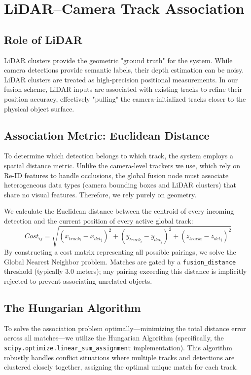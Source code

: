 \documentclass[12pt,a4paper]{report}
\begin{document}
{\section{LiDAR--Camera Track Association}

\subsection{Role of LiDAR}
LiDAR clusters provide the geometric "ground truth" for the system. While camera detections provide semantic labels, their depth estimation can be noisy. LiDAR clusters are treated as high-precision positional measurements. In our fusion scheme, LiDAR inputs are associated with existing tracks to refine their position accuracy, effectively "pulling" the camera-initialized tracks closer to the physical object surface.

\subsection{Association Metric: Euclidean Distance}
To determine which detection belongs to which track, the system employs a spatial distance metric. Unlike the camera-level trackers we use, which rely on Re-ID features to handle occlusions, the global fusion node must associate heterogeneous data types (camera bounding boxes and LiDAR clusters) that share no visual features. Therefore, we rely purely on geometry.

We calculate the Euclidean distance between the centroid of every incoming detection and the current position of every active global track:
\begin{equation}
    Cost_{ij} = \sqrt{(x_{track_i} - x_{det_j})^2 + (y_{track_i} - y_{det_j})^2 + (z_{track_i} - z_{det_j})^2}
\end{equation}
By constructing a cost matrix representing all possible pairings, we solve the Global Nearest Neighbor problem. Matches are gated by a \texttt{fusion\_distance} threshold (typically 3.0 meters); any pairing exceeding this distance is implicitly rejected to prevent associating unrelated objects.

\subsection{The Hungarian Algorithm}
To solve the association problem optimally—minimizing the total distance error across all matches—we utilize the Hungarian Algorithm (specifically, the \texttt{scipy.optimize.linear\_sum\_assignment} implementation). This algorithm robustly handles conflict situations where multiple tracks and detections are clustered closely together, assigning the optimal unique match for each track.

}
\end{document}
